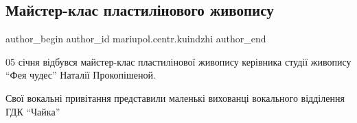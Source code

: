  
 
 
 
 

\subsection{Майстер-клас пластилінового живопису}
\label{sec:05_01_2019.fb.mariupol.centr.kuindzhi.1.majster_klass_plastilin_zhivopys}

\ifcmt
 author_begin
   author_id mariupol.centr.kuindzhi
 author_end
\fi

05 січня відбувся майстер-клас пластилінової живопису керівника студії живопису
\enquote{Фея чудес} Наталії Прокопішеной.

Свої вокальні привітання представили маленькі вихованці вокального відділення
ГДК \enquote{Чайка}
